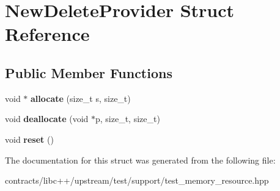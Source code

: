 \hypertarget{struct_new_delete_provider}{}\section{New\+Delete\+Provider Struct Reference}
\label{struct_new_delete_provider}
\subsection*{Public Member Functions}
\begin{DoxyCompactItemize}
\item 
\mbox{\label{struct_new_delete_provider_a269e19a2a4ffd19992ce55762e59dc76}} 
void $\ast$ {\bfseries allocate} (size\+\_\+t s, size\+\_\+t)
\item 
\mbox{\label{struct_new_delete_provider_a9047ce1814e0e46ff6c951a56fa0c57b}} 
void {\bfseries deallocate} (void $\ast$p, size\+\_\+t, size\+\_\+t)
\item 
\mbox{\label{struct_new_delete_provider_ac6c58c67a252ce6f949c07e25ea32af7}} 
void {\bfseries reset} ()
\end{DoxyCompactItemize}


The documentation for this struct was generated from the following file\+:\begin{DoxyCompactItemize}
\item 
contracts/libc++/upstream/test/support/test\+\_\+memory\+\_\+resource.\+hpp\end{DoxyCompactItemize}
